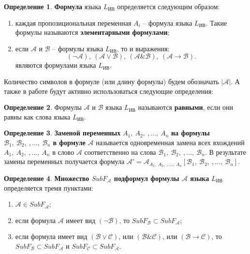 \documentclass[a4paper,12pt]{article}
\theoremstyle{definition}
\newtheorem{definition}{Определение}
\begin{document}
	\begin{definition}
		\textbf{Формула} языка $ L_{\text{ИВ}} $ определяется следующим образом:
		\begin{enumerate}
			\item каждая пропозициональная переменная $ A_{i} $ – формула языка $ L_{\text{ИВ}} $. Такие формулы называются \textbf{элементарными формулами};
			\item  если $ \mathcal{A} $ и $ \mathcal{B} $ – формулы языка $ L_{\text{ИВ}} $, то и выражения:  
			\[ \left( \lnot \mathcal{A} \right),\: 
			\left( \mathcal{A} \lor \mathcal{B} \right),\: 
			\left( \mathcal{A} \& \mathcal{B}\right),\:  
			\left( \mathcal{A} \to \mathcal{B}\right). \]
			являются формулами языка $ L_{\text{ИВ}} $.
		\end{enumerate}
	\end{definition}
	
	Количество символов в формуле (или длину формулы) будем обозначать $ \left| \mathcal{A} \right| $.
	А также в работе будут активно использоваться следующие определения:
	
	\begin{definition}
		Формулы $ \mathcal{A} $ и $ \mathcal{B} $ языка $ L_{\text{ИВ}} $ называются \textbf{равными}, если они равны как слова языка $ L_{\text{ИВ}}$. 
	\end{definition}
	
	\begin{definition}
		\textbf{Заменой переменных} $ A_{1},\:A_{2},\:,...,\:A_{n}$ \textbf{на формулы} $ \mathcal{B}_{1},\:\mathcal{B}_{2},\:,...,\:\mathcal{B}_{n} $\textbf{ в формуле} $ \mathcal{A} $ называется одновременная замена всех вхождений $ A_{1},\:A_{2},\:,...,\:A_{n}$ в слово $ \mathcal{A} $ соответственно на слова $ \mathcal{B}_{1},\:\mathcal{B}_{2},\:,...,\:\mathcal{B}_{n} $. В результате замены переменных получается формула $ \mathcal{A}' = \mathcal{A}_{A_{1},\:A_{2},\:,...,\:A_{n}}\left[ \mathcal{B}_{1},\:\mathcal{B}_{2},\:,...,\:\mathcal{B}_{n}\right]  $.
	\end{definition}
	
	\begin{definition}
		\textbf{Множество $ SubF_{\mathcal{A}} $ подформул формулы $ \mathcal{A} $ языка }$ L_{\text{ИВ}} $ определяется тремя пунктами:
		\begin{enumerate}
			\item $ \mathcal{A} \in SubF_{\mathcal{A}} $; 
			\item если формула $ \mathcal{A} $ имеет вид $ \left( \lnot \mathcal{B} \right) $, то $ SubF_{\mathcal{B}} \subset SubF_{\mathcal{A}} $;
			\item если формула имеет вид $\left( \mathcal{B} \lor \mathcal{C} \right)$, или $
			\left( \mathcal{B} \& \mathcal{C}\right)$, или $  
			\left( \mathcal{B} \to \mathcal{C}\right)$, то $ SubF_{\mathcal{B}} \subset SubF_{\mathcal{A}} $ и $ SubF_{\mathcal{C}} \subset SubF_{\mathcal{A}} $.
		\end{enumerate}
	\end{definition}
	
\end{document}
